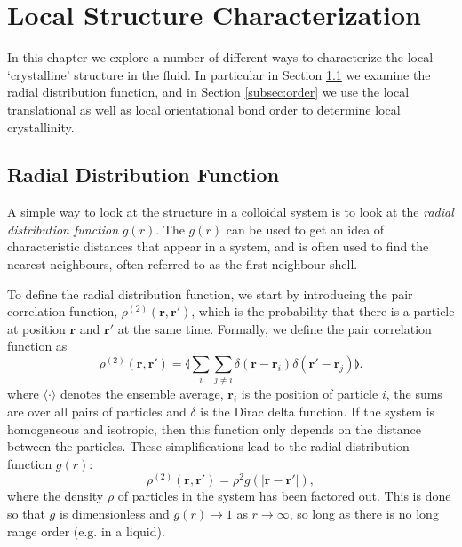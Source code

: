 \documentclass[thesis]{subfiles}
\begin{document}
\newpage

\section{Local Structure Characterization}

In this chapter we explore a number of different ways to characterize the local `crystalline' structure in the fluid. In particular in Section \ref{subsec:rdf} we examine the radial distribution function, and in Section \ref{subsec:order} we use the local translational as well as local orientational bond order to determine local crystallinity.

\subsection{Radial Distribution Function} \label{subsec:rdf}

A simple way to look at the structure in a colloidal system is to look at the \emph{radial distribution function} $g(r)$.  The $g(r)$ can be used to get an idea of characteristic distances that appear in a system, and is often used to find the nearest neighbours, often referred to as the first neighbour shell. 

To define the radial distribution function, we start by introducing the pair correlation function, 
 $\rho^{(2)}(\bm r, \bm r')$,  which is the probability that there is a particle at position $\bm r$ and $\bm r'$ at the same time. Formally, we define the pair correlation function as 
\begin{equation}
\rho^{(2)}(\bm r, \bm r') = \llangle \sum_i \sum_{j \neq i} \delta(\bm r - \bm r_i) \delta(\bm r' - \bm r_j) \rrangle.
\end{equation}
where $\langle \cdot \rangle$ denotes the ensemble average, $\bm r_i$ is the position of particle $i$, the sums are over all pairs of particles and $\delta$ is the Dirac delta function.
If the system is homogeneous and isotropic, then this function only depends on the distance between the particles. These simplifications lead to the radial distribution function $g(r)$:
\begin{equation}
\rho^{(2)}(\bm r, \bm r') = \rho^2 g(|\bm r - \bm r'|), \label{eq:gofr}
\end{equation}
where the density $\rho$ of particles in the system has been factored out. This is done so that $g$ is dimensionless and $g(r) \rightarrow 1$ as $r \rightarrow \infty$, so long as there is no long range order (e.g. in a liquid).
\end{document}
